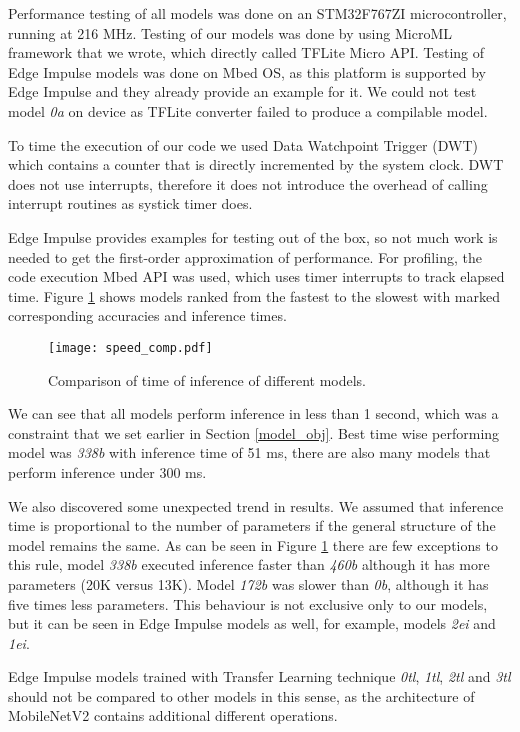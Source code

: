 Performance testing of all models was done on an STM32F767ZI microcontroller, running at 216 \si{\mega\hertz}.
Testing of our models was done by using MicroML framework that we wrote, which directly called TFLite Micro API.
Testing of Edge Impulse models was done on Mbed OS, as this platform is supported by Edge Impulse and they already provide an example for it.
We could not test model \textit{0a} on device as TFLite converter failed to produce a compilable model.

To time the execution of our code we used Data Watchpoint Trigger (DWT) which contains a counter that is directly incremented by the system clock.
DWT does not use interrupts, therefore it does not introduce the overhead of calling interrupt routines as systick timer does.


Edge Impulse provides examples for testing out of the box, so not much work is needed to get the first-order approximation of performance.
For profiling, the code execution Mbed API was used, which uses timer interrupts to track elapsed time.
Figure \ref{speed_comp} shows models ranked from the fastest to the slowest with marked corresponding accuracies and inference times.

\begin{figure}[ht]
    \centering
    \texttt{[image: speed\_comp.pdf]}
    \caption{ Comparison of time of inference of different models.}
    \label{speed_comp}
\end{figure}

We can see that all models perform inference in less than 1 second, which was a constraint that we set earlier in Section \ref{model_obj}.
Best time wise performing model was \textit{338b} with inference time of 51 \si{\milli\second}, there are also many models that perform inference under 300 \si{\milli\second}.

We also discovered some unexpected trend in results.
We assumed that inference time is proportional to the number of parameters if the general structure of the model remains the same.
As can be seen in Figure \ref{speed_comp} there are few exceptions to this rule, model \textit{338b} executed inference faster than \textit{460b} although it has more parameters (20K versus 13K).
Model \textit{172b} was slower than \textit{0b}, although it has five times less parameters.
This behaviour is not exclusive only to our models, but it can be seen in Edge Impulse models as well, for example, models \textit{2ei} and \textit{1ei}.

Edge Impulse models trained with Transfer Learning technique \textit{0tl}, \textit{1tl}, \textit{2tl} and \textit{3tl} should not be compared to other models in this sense, as the architecture of MobileNetV2 contains additional different operations.

